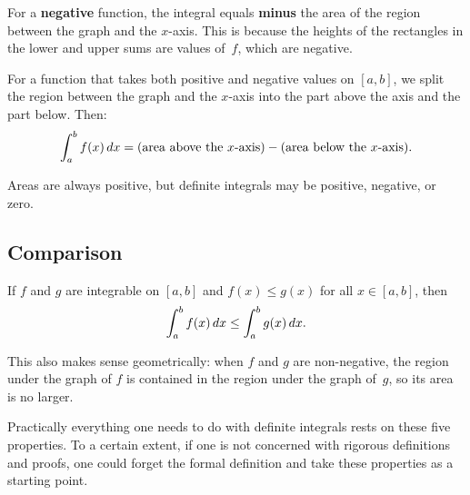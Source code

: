 \begin{remark}
For a \textbf{negative} function, the integral equals \textbf{minus} the area of the region between the graph and the $x$-axis.  This is because the heights of the rectangles in the lower and upper sums are values of~$f$, which are negative.
\end{remark}

For a function that takes both positive and negative values on $[a,b]$, we split the region between the graph and the $x$-axis into the part above the axis and the part below. Then:
\[
  \int_{a}^{b} f(x)\,dx = (\text{area above the }x\text{-axis}) - (\text{area below the }x\text{-axis}).
\]

\begin{remark}[Warning]
Areas are always positive, but definite integrals may be positive, negative, or zero.
\end{remark}

\subsection*{Comparison}

\begin{theorem}
\label{thm:7-14}
If $f$ and $g$ are integrable on $[a,b]$ and $f(x) \le g(x)$ for all $x \in [a,b]$, then
\[
  \int_{a}^{b} f(x)\,dx \le \int_{a}^{b} g(x)\,dx.
\]
\end{theorem}

\begin{remark}
This also makes sense geometrically: when $f$ and $g$ are non-negative, the region under the graph of $f$ is contained in the region under the graph of~$g$, so its area is no larger.
\end{remark}

\begin{remark}
Practically everything one needs to do with definite integrals rests on these five properties.  To a certain extent, if one is not concerned with rigorous definitions and proofs, one could forget the formal definition and take these properties as a starting point.
\end{remark}

